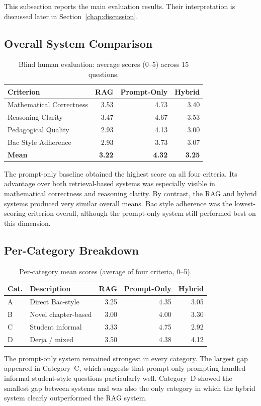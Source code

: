 This subsection reports the main evaluation results. Their interpretation is
discussed later in Section~\ref{chap:discussion}.

\subsection{Overall System Comparison}

\begin{table}[H]
\centering
\caption{Blind human evaluation: average scores (0--5) across 15 questions.}
\label{tab:human-evaluation}
\begin{tabular}{lrrr}
\toprule
\textbf{Criterion} & \textbf{RAG} & \textbf{Prompt-Only} & \textbf{Hybrid} \\
\midrule
Mathematical Correctness & 3.53 & 4.73 & 3.40 \\
Reasoning Clarity        & 3.47 & 4.67 & 3.53 \\
Pedagogical Quality      & 2.93 & 4.13 & 3.00 \\
Bac Style Adherence      & 2.93 & 3.73 & 3.07 \\
\midrule
\textbf{Mean} & \textbf{3.22} & \textbf{4.32} & \textbf{3.25} \\
\bottomrule
\end{tabular}
\end{table}

The prompt-only baseline obtained the highest score on all four criteria.
Its advantage over both retrieval-based systems was especially visible in
mathematical correctness and reasoning clarity. By contrast, the RAG and
hybrid systems produced very similar overall means. Bac style adherence was
the lowest-scoring criterion overall, although the prompt-only system still
performed best on this dimension.

\subsection{Per-Category Breakdown}

\begin{table}[H]
\centering
\caption{Per-category mean scores (average of four criteria, 0--5).}
\label{tab:per-category}
\begin{tabular}{llrrr}
\toprule
\textbf{Cat.} & \textbf{Description} & \textbf{RAG} & \textbf{Prompt-Only} & \textbf{Hybrid} \\
\midrule
A & Direct Bac-style        & 3.25 & 4.35 & 3.05 \\
B & Novel chapter-based     & 3.00 & 4.00 & 3.30 \\
C & Student informal        & 3.33 & 4.75 & 2.92 \\
D & Derja / mixed           & 3.50 & 4.38 & 4.12 \\
\bottomrule
\end{tabular}
\end{table}
The prompt-only system remained strongest in every category. The largest gap
appeared in Category~C, which suggests that prompt-only prompting handled
informal student-style questions particularly well. Category~D showed the
smallest gap between systems and was also the only category in which the
hybrid system clearly outperformed the RAG system.
